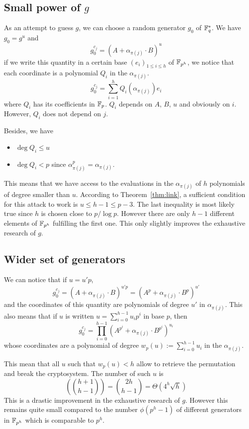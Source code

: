 \documentclass[12pt,a4paper,titlepage]{article}
\newcommand{\GF}[1]{\F_{#1}}
\begin{document}
\subsection{Small power of $g$}

As an attempt to guess $g$, we can choose a random generator $g_0$ of $\GF{q}^{*}$. We have $g_0 = g^u$ and
$$ g_0 ^{c_j} = (A + \alpha_{\pi(j)} \cdot B)^u $$
if we write this quantity in a certain base $(e_i)_{1 \leq i \leq h}$ of $\GF{p^h}$, we notice that each coordinate is a polynomial $Q_i$ in the $\alpha_{\pi(j)}$.
$$ g_0^{c_j} = \sum_{i=1}^h Q_i(\alpha_{\pi(j)}) e_i $$
where $Q_i$ has its coefficients in $\GF{p}$.
$Q_i$ depends on $A$, $B$, $u$ and obviously on $i$. However, $Q_i$ does not depend on $j$.

Besides, we have
\begin{itemize}
\item $\deg Q_i \leq u$
\item $\deg Q_i < p$ since $\alpha_{\pi(j)}^p = \alpha_{\pi(j)}$.
\end{itemize}

This means that we have access to the evaluations in the $\alpha_{\pi(j)}$ of $h$ polynomials of degree smaller than $u$. According to Theorem~\ref{thm:link}, a sufficient condition for this attack to work is $u \leq h-1 \leq p-3$. The last inequality is most likely true since $h$ is chosen close to $p / \log p$. However there are only $h-1$ different elements of $\GF{p^h}$ fulfilling the first one.
This only slightly improves the exhaustive research of $g$.


\subsection{Wider set of generators}

We can notice that if $u = u'p$,
$$ g_0^{c_j} = (A + \alpha_{\pi(j)} \cdot B)^{u'p} = (A^p + \alpha_{\pi(j)} \cdot B^p)^{u'} $$
and the coordinates of this quantity are polynomials of degree $u'$ in $\alpha_{\pi(j)}$.
This also means that if $u$ is written $u = \sum_{i=0}^{h-1} u_i p^i$ in base $p$, then
$$ g_0^{c_j} = \prod_{i=0}^{h-1} (A^{p^i} + \alpha_{\pi(j)} \cdot B^{p^i} )^{u_i} $$
whose coordinates are a polynomial of degree $w_p(u) := \sum_{i=0}^{h-1} u_i$ in the $\alpha_{\pi(j)}$.

This mean that all $u$ such that $w_p(u) < h$ allow to retrieve the permutation and break the cryptosystem.
The number of such $u$ is
$$ \left( \binom{h+1}{h-1} \right) = \binom{2h}{h-1} =\Theta\left( 4^h \sqrt{h} \right) $$
This is a drastic improvement in the exhaustive research of $g$. However this remains quite small compared to the number $\phi(p^h-1)$ of different generators in $\GF{p^h}$ which is comparable to $p^h$.
\end{document}
